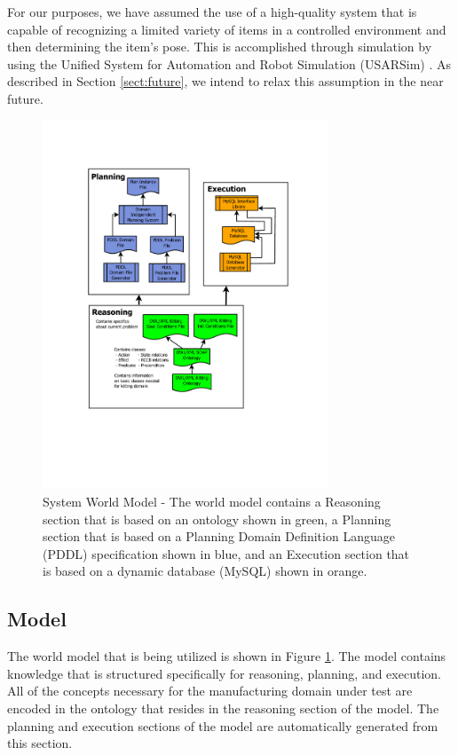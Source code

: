 For our purposes, 
we have assumed the use of a high-quality
system that is capable of recognizing a limited variety of items in a controlled environment and then determining the item's pose. This is accomplished through
simulation by using the Unified System for Automation and Robot Simulation (USARSim) \cite{Balakirsky2007}. As described in Section \ref{sect:future}, 
we intend to relax this assumption in the near future.
%
\begin{figure}[htb!]
\begin{center}
\includegraphics[width=8.5cm]{images/RITAWorldModel.pdf}
\caption{System World Model - The world model contains a Reasoning section that is based on an ontology shown in green,
a Planning section that is based on a Planning Domain Definition Language (PDDL) specification shown in blue, and an Execution section that is based on a dynamic database (MySQL) shown in orange.}
\label{fig:WorldModel}
\end{center}
\end{figure}
%
\subsection{Model}
\label{subsection:Model}
The world model that is being utilized is shown in Figure \ref{fig:WorldModel}. The model contains knowledge that is structured specifically for
reasoning, planning, and execution. All of the concepts necessary for the manufacturing domain under test are
encoded in the ontology that resides in the reasoning section of the model. The planning and execution sections of the model are automatically generated from
this section.
%
